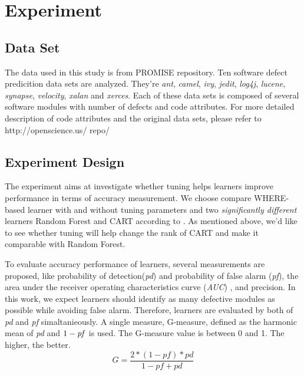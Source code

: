 \documentclass{sig-alternative}
\begin{document}
\section{Experiment}

\subsection{Data Set}

The data used in this study is from PROMISE repository. Ten software defect predicition data 
sets are analyzed. They're {\it ant}, {\it camel}, {\it ivy}, {\it jedit}, {\it log4j}, {\it lucene}, {\it 
synapse}, {\it velocity}, {\it xalan} and {\it xerces}. Each of these data sets is composed of 
several software modules with number of defects and code attributes. For more detailed 
description of code attributes and the original data sets, please refer to  http://openscience.us/
repo/

\subsection{Experiment Design}

The experiment aims at investigate whether tuning helps learners improve performance in 
terms of accuracy measurement. We choose compare WHERE-based learner with and 
without tuning parameters and two {\it significantly different} learners Random Forest and 
CART according to \cite{lessmann2008benchmarking}. As mentioned above, we'd like to see 
whether tuning will help change the rank of CART and make it comparable with Random 
Forest. 

To evaluate accuracy performance of learners, several measurements are proposed, like 
probability of  detection({\it pd}) and probability of false alarm ({\it pf})\cite{menzies2007data}, 
the area under the receiver operating characteristics curve ({\it AUC})
\cite{lessmann2008benchmarking}, and precision\cite{zhang2007comments}. In this work, we 
expect learners should identify as many defective modules as possible while avoiding false 
alarm. Therefore, learners are evaluated by both of {\it pd} and {\it pf} simaltanieously. A single 
measure, G-measure, defined as the harmonic mean of {\it pd} and $1-{\it pf}$  is used. The 
G-measure value is between 0 and 1. The higher, the better.
\begin{equation}
G = \frac{2*(1-pf)*pd}{1-pf+pd}
\end{equation}
\end{document}
